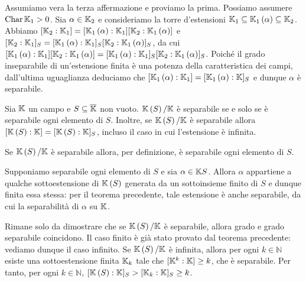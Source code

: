 \par Assumiamo vera la terza affermazione e proviamo la prima. Possiamo assumere $\operatorname{Char}{\mathbb{K}_1} > 0$. Sia $\alpha \in \mathbb{K}_2$ e consideriamo la torre d'estensioni $\mathbb{K}_1 \subseteq \mathbb{K}_1 \left ( \alpha \right ) \subseteq \mathbb{K}_2$. Abbiamo $[\mathbb{K}_2:\mathbb{K}_1] = [\mathbb{K}_1 \left ( \alpha \right ):\mathbb{K}_1][\mathbb{K}_2:\mathbb{K}_1 \left ( \alpha \right )]$ e $[\mathbb{K}_2:\mathbb{K}_1]_S = [\mathbb{K}_1 \left ( \alpha \right ):\mathbb{K}_1]_S[\mathbb{K}_2:\mathbb{K}_1 \left ( \alpha \right )]_S$, da cui $[\mathbb{K}_1 \left ( \alpha \right ):\mathbb{K}_1][\mathbb{K}_2:\mathbb{K}_1 \left ( \alpha \right )] = [\mathbb{K}_1 \left ( \alpha \right ):\mathbb{K}_1]_S[\mathbb{K}_2:\mathbb{K}_1 \left ( \alpha \right )]_S$. Poich\'e il grado inseparabile di un'estensione finita \`e una potenza della caratteristica dei campi, dall'ultima uguaglianza deduciamo che $[\mathbb{K}_1 \left ( \alpha \right ):\mathbb{K}_1] = [\mathbb{K}_1 \left ( \alpha \right ):\mathbb{K}]_S$ e dunque $\alpha$ \`e separabile. \EndProof
\begin{Corollary}
	Sia $\mathbb{K}$ un campo e $S \subseteq \overline{\mathbb{K}}$ non vuoto. $\mathbb{K} \left ( S \right )/\mathbb{K}$ \`e separabile se e solo se \`e separabile ogni elemento di $S$. Inoltre, se $\mathbb{K} \left ( S \right )/\mathbb{K}$ \`e separabile allora $[\mathbb{K} \left ( S \right ):\mathbb{K}] = [\mathbb{K} \left ( S \right ):\mathbb{K}]_S$, incluso il caso in cui l'estensione \`e infinita.
\end{Corollary}
\Proof Se $\mathbb{K} \left ( S \right )/\mathbb{K}$ \`e separabile allora, per definizione, \`e separabile ogni elemento di $S$.
\par Supponiamo separabile ogni elemento di $S$ e sia $\alpha \in \mathbb{K}{S}$. Allora $\alpha$ appartiene a qualche sottoestensione di $\mathbb{K} \left ( S \right )$ generata da un sottoinsieme finito di $S$ e dunque finita essa stessa: per il teorema precedente, tale estensione \`e anche separabile, da cui la separabilit\`a di $\alpha$ su $\mathbb{K}$.
\par Rimane solo da dimostrare che se $\mathbb{K} \left ( S \right )/\mathbb{K}$ \`e separabile, allora grado e grado separabile coincidono. Il caso finito \`e gi\`a stato provato dal teorema precedente: vediamo dunque il caso infinito. Se $\mathbb{K} \left ( S \right )/\mathbb{K}$ \`e infinita, allora per ogni $k \in \mathbb{N}$ esiste una sottoestensione finita $\mathbb{K}_k$ tale che $[\mathbb{K}^k:\mathbb{K}] \geq k$, che \`e separabile. Per tanto, per ogni $k \in \mathbb{N}$, $[\mathbb{K} \left ( S \right ):\mathbb{K}]_S > [\mathbb{K}_k:\mathbb{K}]_S \geq k$. \EndProof
